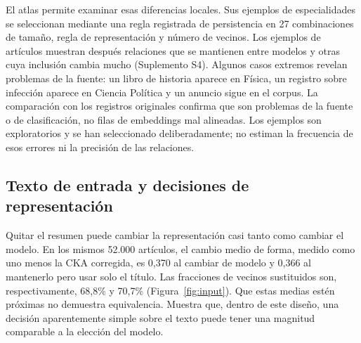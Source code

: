 \documentclass[12pt]{article}
\begin{document}
El atlas permite examinar esas diferencias locales. Sus ejemplos de especialidades se seleccionan mediante una regla registrada de persistencia en 27 combinaciones de tamaño, regla de representación y número de vecinos. Los ejemplos de artículos muestran después relaciones que se mantienen entre modelos y otras cuya inclusión cambia mucho (Suplemento S4). Algunos casos extremos revelan problemas de la fuente: un libro de historia aparece en Física, un registro sobre infección aparece en Ciencia Política y un anuncio sigue en el corpus. La comparación con los registros originales confirma que son problemas de la fuente o de clasificación, no filas de embeddings mal alineadas. Los ejemplos son exploratorios y se han seleccionado deliberadamente; no estiman la frecuencia de esos errores ni la precisión de las relaciones.

\subsection{Texto de entrada y decisiones de representación}
Quitar el resumen puede cambiar la representación casi tanto como cambiar el modelo. En los mismos 52.000 artículos, el cambio medio de forma, medido como uno menos la CKA corregida, es 0,370 al cambiar de modelo y 0,366 al mantenerlo pero usar solo el título. Las fracciones de vecinos sustituidos son, respectivamente, 68,8\% y 70,7\% (Figura~\ref{fig:input}). Que estas medias estén próximas no demuestra equivalencia. Muestra que, dentro de este diseño, una decisión aparentemente simple sobre el texto puede tener una magnitud comparable a la elección del modelo.

\end{document}
